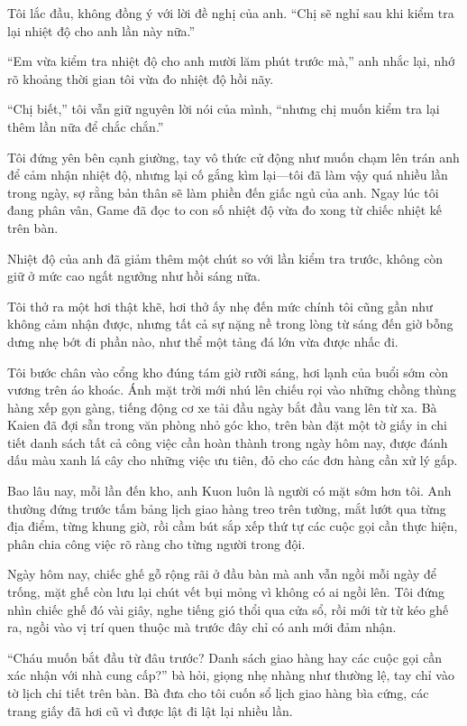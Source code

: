 \documentclass[../main.tex]{subfiles}
\begin{document}
Tôi lắc đầu, không đồng ý với lời đề nghị của anh. ``Chị sẽ nghỉ sau khi kiểm tra lại nhiệt độ cho anh lần này nữa.''

``Em vừa kiểm tra nhiệt độ cho anh mười lăm phút trước mà,'' anh nhắc lại, nhớ rõ khoảng thời gian tôi vừa đo nhiệt độ hồi nãy.

``Chị biết,'' tôi vẫn giữ nguyên lời nói của mình, ``nhưng chị muốn kiểm tra lại thêm lần nữa để chắc chắn.''

Tôi đứng yên bên cạnh giường, tay vô thức cử động như muốn chạm lên trán anh để cảm nhận nhiệt độ, nhưng lại cố gắng kìm lại—tôi đã làm vậy quá nhiều lần trong ngày, sợ rằng bản thân sẽ làm phiền đến giấc ngủ của anh. Ngay lúc tôi đang phân vân, Game đã đọc to con số nhiệt độ vừa đo xong từ chiếc nhiệt kế trên bàn.

Nhiệt độ của anh đã giảm thêm một chút so với lần kiểm tra trước, không còn giữ ở mức cao ngất ngưởng như hồi sáng nữa.

Tôi thở ra một hơi thật khẽ, hơi thở ấy nhẹ đến mức chính tôi cũng gần như không cảm nhận được, nhưng tất cả sự nặng nề trong lòng từ sáng đến giờ bỗng dưng nhẹ bớt đi phần nào, như thể một tảng đá lớn vừa được nhấc đi.


Tôi bước chân vào cổng kho đúng tám giờ rưỡi sáng, hơi lạnh của buổi sớm còn vương trên áo khoác. Ánh mặt trời mới nhú lên chiếu rọi vào những chồng thùng hàng xếp gọn gàng, tiếng động cơ xe tải đầu ngày bắt đầu vang lên từ xa. Bà Kaien đã đợi sẵn trong văn phòng nhỏ góc kho, trên bàn đặt một tờ giấy in chi tiết danh sách tất cả công việc cần hoàn thành trong ngày hôm nay, được đánh dấu màu xanh lá cây cho những việc ưu tiên, đỏ cho các đơn hàng cần xử lý gấp.

Bao lâu nay, mỗi lần đến kho, anh Kuon luôn là người có mặt sớm hơn tôi. Anh thường đứng trước tấm bảng lịch giao hàng treo trên tường, mắt lướt qua từng địa điểm, từng khung giờ, rồi cầm bút sắp xếp thứ tự các cuộc gọi cần thực hiện, phân chia công việc rõ ràng cho từng người trong đội. 

Ngày hôm nay, chiếc ghế gỗ rộng rãi ở đầu bàn mà anh vẫn ngồi mỗi ngày để trống, mặt ghế còn lưu lại chút vết bụi mỏng vì không có ai ngồi lên. Tôi đứng nhìn chiếc ghế đó vài giây, nghe tiếng gió thổi qua cửa sổ, rồi mới từ từ kéo ghế ra, ngồi vào vị trí quen thuộc mà trước đây chỉ có anh mới đảm nhận.

``Cháu muốn bắt đầu từ đâu trước? Danh sách giao hàng hay các cuộc gọi cần xác nhận với nhà cung cấp?'' bà hỏi, giọng nhẹ nhàng như thường lệ, tay chỉ vào tờ lịch chi tiết trên bàn. Bà đưa cho tôi cuốn sổ lịch giao hàng bìa cứng, các trang giấy đã hơi cũ vì được lật đi lật lại nhiều lần.
\end{document}
